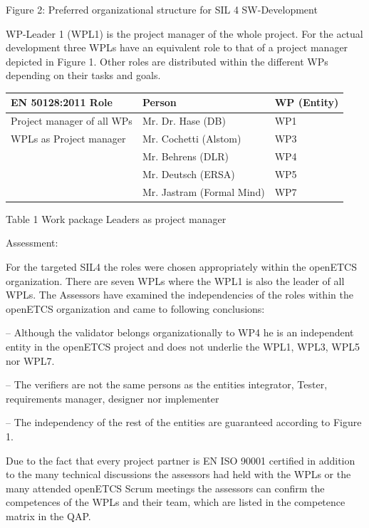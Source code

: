 Figure 2: Preferred organizational structure for SIL 4 SW-Development

WP-Leader 1 (WPL1) is the project manager of the whole project. For the actual development three WPLs have an equivalent
role to that of a project manager depicted in Figure 1. Other roles are distributed within the different WPs depending
on their tasks and goals.


\bigskip

\begin{center}
\tablefirsthead{}
\tablehead{}
\tabletail{}
\tablelasttail{}
\begin{supertabular}{|m{5.467cm}|m{5.467cm}|m{3.467cm}|}
\hline
EN 50128:2011 Role  &
Person  &
WP (Entity) \\\hline
Project manager of all WPs  &
Mr. Dr. Hase (DB)  &
WP1 \\\hline
WPLs as Project manager  &
Mr. Cochetti (Alstom)  &
WP3\\\hline
~
 &
Mr. Behrens (DLR) &
WP4\\\hline
~
 &
Mr. Deutsch (ERSA)  &
WP5\\\hline
~
 &
Mr. Jastram (Formal Mind)  &
WP7\\\hline
\end{supertabular}
\end{center}
Table 1 Work package Leaders as project manager


\bigskip

Assessment:

For the targeted SIL4 the roles were chosen appropriately within the openETCS organization. There are seven WPLs where
the WPL1 is also the leader of all WPLs. The Assessors have examined the independencies of the roles within the
openETCS organization and came to following conclusions:

{}-- Although the validator belongs organizationally to WP4 he is an independent entity in the openETCS project and does
not underlie the WPL1, WPL3, WPL5 nor WPL7.

{}-- The verifiers are not the same persons as the entities integrator, Tester, requirements manager, designer nor
implementer

{}-- The independency of the rest of the entities are guaranteed according to Figure 1.

Due to the fact that every project partner is EN ISO 90001 certified in addition to the many technical discussions the
assessors had held with the WPLs or the many attended openETCS Scrum meetings the assessors can confirm the competences
of the WPLs and their team, which are listed in the competence matrix in the QAP.

